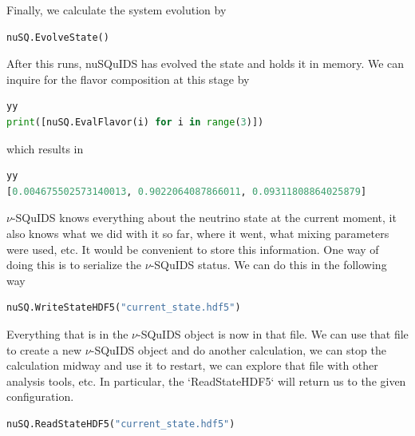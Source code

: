\documentclass[3p,12pt]{elsarticle}
\newcommand{\ttf}{\ttfamily}
\begin{document}
Finally, we calculate the system evolution by
\begin{lstlisting}[language=Python, breaklines=true]
nuSQ.EvolveState()
\end{lstlisting}

After this runs, {\ttf nuSQuIDS} has evolved the state and holds it in memory.
We can inquire for the flavor composition at this stage by
\begin{lstlisting}[language=Python, breaklines=true]yy
print([nuSQ.EvalFlavor(i) for i in range(3)])
\end{lstlisting}

which results in
\begin{lstlisting}[language=Python, breaklines=true]yy
[0.004675502573140013, 0.9022064087866011, 0.09311808864025879]
\end{lstlisting}

$\nu$-SQuIDS knows everything about the neutrino state at the current moment, it also knows what we did with it so far, where it went, what mixing parameters were used, etc. It would be convenient to store this information. One way of doing this is to serialize the $\nu$-SQuIDS status. We can do this in the following way
\begin{lstlisting}[language=Python, breaklines=true]
nuSQ.WriteStateHDF5("current_state.hdf5")
\end{lstlisting}

Everything that is in the $\nu$-SQuIDS object is now in that file. We can use that file to create a new $\nu$-SQuIDS object and do another calculation, we can stop the calculation midway and use it to restart, we can explore that file with other analysis tools, etc. In particular, the `ReadStateHDF5` will return us to the given configuration.
\begin{lstlisting}[language=Python, breaklines=true]
nuSQ.ReadStateHDF5("current_state.hdf5")
\end{lstlisting}
\end{document}
